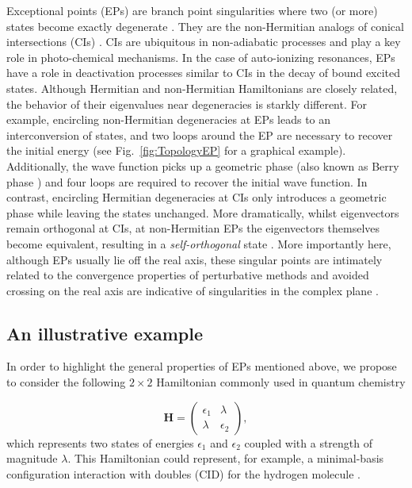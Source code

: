 \documentclass[11pt,a4paper]{article}
\newcommand{\bH}{\mathbf{H}}
\begin{document}
Exceptional points (EPs) are branch point singularities where two (or more) states become exactly degenerate \cite{Heiss_1990, Heiss_1999, Heiss_2012, Heiss_2016}. 
They are the non-Hermitian analogs of conical intersections (CIs) \cite{Yarkony_1996}.
CIs are ubiquitous in non-adiabatic processes and play a key role in photo-chemical mechanisms.
In the case of auto-ionizing resonances, EPs have a role in deactivation processes similar to CIs in the decay of bound excited states.
Although Hermitian and non-Hermitian Hamiltonians are closely related, the behavior of their eigenvalues near degeneracies is starkly different.
For example, encircling non-Hermitian degeneracies at EPs leads to an interconversion of states, and two loops around the EP are necessary to recover the initial energy (see Fig.~\ref{fig:TopologyEP} for a graphical example).
Additionally, the wave function picks up a geometric phase (also known as Berry phase \cite{Berry_1984}) and four loops are required to recover the initial wave function.
In contrast, encircling Hermitian degeneracies at CIs only introduces a geometric phase while leaving the states unchanged.
More dramatically, whilst eigenvectors remain orthogonal at CIs, at non-Hermitian EPs the eigenvectors themselves become equivalent, resulting in a \textit{self-orthogonal} state \cite{MoiseyevBook}.
More importantly here, although EPs usually lie off the real axis, these singular points are intimately related to the convergence properties of perturbative methods and avoided crossing on the real axis are indicative of singularities in the complex plane \cite{Olsen_1996, Olsen_2000}.

\subsection{An illustrative example}
In order to highlight the general properties of EPs mentioned above, we propose to consider the following $2 \times 2$ Hamiltonian commonly used in quantum chemistry

\begin{equation}
\label{eq:H_2x2}
	\bH = 
	\begin{pmatrix}
		\epsilon_1	&	\lambda	\\
		\lambda		&	\epsilon_2
	\end{pmatrix},
\end{equation}
which represents two states of energies $\epsilon_1$ and $\epsilon_2$ coupled with a strength of magnitude $\lambda$.
This Hamiltonian could represent, for example, a minimal-basis configuration interaction with doubles (CID) for the hydrogen molecule \cite{SzaboBook}.
\end{document}
